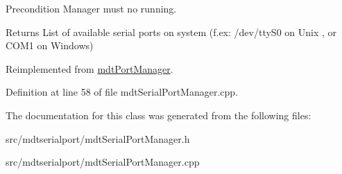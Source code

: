 \begin{DoxyPrecond}{Precondition}
Manager must no running. 
\end{DoxyPrecond}
\begin{DoxyReturn}{Returns}
List of available serial ports on system (f.ex: /dev/ttyS0 on Unix , or COM1 on Windows) 
\end{DoxyReturn}


Reimplemented from \hyperlink{classmdt_port_manager_ad56afb411ab5468005fca04767557ece}{mdtPortManager}.



Definition at line 58 of file mdtSerialPortManager.cpp.



The documentation for this class was generated from the following files:\begin{DoxyCompactItemize}
\item 
src/mdtserialport/mdtSerialPortManager.h\item 
src/mdtserialport/mdtSerialPortManager.cpp\end{DoxyCompactItemize}
